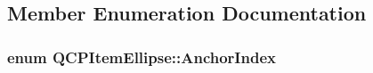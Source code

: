 \subsection{Member Enumeration Documentation}
\hypertarget{class_q_c_p_item_ellipse_a415009889543169f35b70795f415e45e}{
\subsubsection[{Anchor\-Index}]{\setlength{\rightskip}{0pt plus 5cm}enum {\bf Q\-C\-P\-Item\-Ellipse\-::\-Anchor\-Index}\hspace{0.3cm}{\ttfamily [protected]}}}\label{class_q_c_p_item_ellipse_a415009889543169f35b70795f415e45e}
